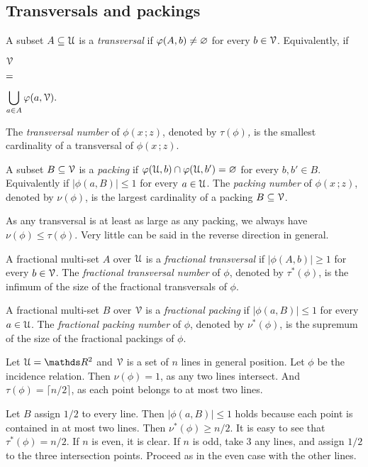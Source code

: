 \documentclass[scombinatorics.tex]{subfiles}
\begin{document}
\chapter{}
\label{fractional}



\def\medrel#1{\parbox[t]{5ex}{$\displaystyle\hfil #1$}}
\def\ceq#1#2#3{\parbox[t]{20ex}{$\displaystyle #1$}\medrel{#2}{$\displaystyle #3$}}


\section{Transversals and packings}\label{Transversals_Packings}

A subset $A\subseteq\EuScript U$ is a \emph{transversal\/} if $\varphi(A,b)\neq\varnothing$ for every $b\in\EuScript V$. Equivalently, if 

\ceq{\hfill\V}
{=}
{\bigcup_{a\in A}\phi(a,\V).}


The \emph{transversal number\/} of $\phi(x\,;z)$, denoted by\emph{ $\tau(\phi)$,} is the smallest cardinality of a transversal of $\phi(x\,;z)$.

A subset $B\subseteq\EuScript V$ is a \emph{packing\/} if $\varphi(\EuScript U,b)\cap\varphi(\EuScript U,b')=\varnothing$ for every $b,b'\in B$. Equivalently if $|\phi(a,B)|\le1$ for every $a\in\EuScript U$.
The \emph{packing number\/} of $\phi(x\,;z)$, denoted by \emph{$\nu(\phi)$}, is the largest cardinality of a packing  $B\subseteq\EuScript V$.

As any transversal is at least as large as any packing, we always have $\nu(\phi)\le\tau(\phi)$.
Very little can be said in the reverse direction in general.

A fractional multi-set $A$ over $\EuScript U$ is a \emph{fractional transversal\/} if $|\phi(A, b)|\ge1$ for every $b\in\EuScript V$.
The \emph{fractional transversal number\/} of $\phi$, denoted by $\tau^*(\phi)$, is the  infimum of the size of the fractional transversals of $\phi$.

A fractional multi-set $B$ over $\EuScript V$ is a \emph{fractional packing\/} if $|\phi(a,B)|\le1$ for every $a\in\EuScript U$.
The \emph{fractional packing number\/} of $\phi$, denoted by $\nu^*(\phi)$, is the supremum of the size of the fractional packings of $\phi$.

\begin{example}
Let $\U=\RR^2$ and $\EuScript V$ is a set of $n$ lines in general position.
Let $\phi$ be the incidence relation.
Then $\nu(\phi)=1$, as any two lines intersect.
And $\tau(\phi)=\lceil n/2\rceil$, as each point belongs to at most two lines.

Let $B$ assign $1/2$ to every line. Then $|\phi(a,B)|\le1$ holds because each point is contained in at most two lines.
Then $\nu^*(\phi)\ge n/2$.
It is easy to see that $\tau^*(\phi)= n/2$.
If $n$ is even, it is clear.
If $n$ is odd, take $3$ any lines, and assign $1/2$ to the three intersection points.
Proceed as in the even case with the other lines.\QED
\end{example}
\end{document}
